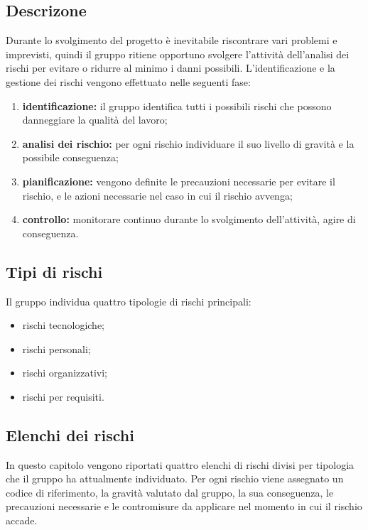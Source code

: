 \subsection{Descrizone}
Durante lo svolgimento del progetto è inevitabile riscontrare vari problemi e imprevisti, quindi il gruppo ritiene opportuno svolgere l’attività dell’analisi dei rischi per evitare o ridurre al minimo i danni possibili.\newline
L’identificazione e la gestione dei rischi vengono effettuato nelle seguenti fase:
\begin{enumerate}
\item \textbf{identificazione:}  il gruppo identifica tutti i possibili rischi che possono danneggiare la qualità del lavoro;
\item \textbf{analisi dei rischio:} per ogni rischio individuare il suo livello di gravità e la possibile conseguenza;
\item \textbf{pianificazione:} vengono definite le precauzioni necessarie per evitare il rischio, e le azioni necessarie nel caso in cui il rischio avvenga;
\item \textbf{controllo:} monitorare continuo durante lo svolgimento dell’attività, agire di conseguenza.
\end{enumerate}

\subsection{Tipi di rischi}
Il gruppo individua quattro tipologie di rischi principali:
\begin{itemize}
\item rischi tecnologiche;
\item rischi personali;
\item rischi organizzativi;
\item rischi per requisiti.
\end{itemize}

\subsection{Elenchi dei rischi}
In questo capitolo vengono riportati quattro elenchi di rischi divisi per tipologia che il gruppo ha attualmente individuato.
Per ogni rischio viene assegnato un codice di riferimento, la gravità valutato dal gruppo, la sua conseguenza, le precauzioni necessarie e le contromisure da applicare nel momento in cui il rischio accade. 
